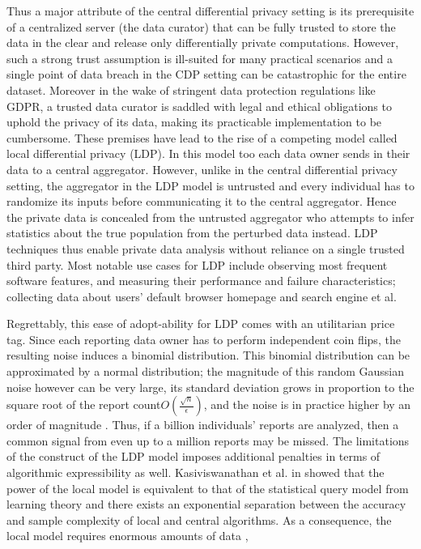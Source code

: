 \par Thus a major attribute of the central differential privacy setting is its prerequisite of a centralized server (the data curator) that can be fully trusted to store the data in the clear and release only differentially private computations. However, such a strong trust assumption is ill-suited for many practical scenarios and a single point of data breach in the CDP setting can be catastrophic for the entire dataset. Moreover in the wake of stringent data protection regulations like GDPR, a trusted data curator is saddled with legal and ethical obligations to uphold the privacy of its data, making its practicable implementation to be cumbersome. These premises have lead to the rise of a competing model called  local differential privacy (LDP). In this model too each data owner sends in their data to a central aggregator. However, unlike in the central differential privacy setting, the aggregator in the LDP model is untrusted and every individual has to randomize its inputs before communicating it to the central aggregator. Hence the private data is concealed from the untrusted aggregator who attempts to infer statistics about the true population from the perturbed data instead. LDP techniques thus enable private data analysis without reliance on a single trusted third party. Most notable use cases for LDP include observing most frequent software features, and measuring
their performance and failure characteristics; collecting data about users' default browser homepage and search engine et al. \par Regrettably, this ease of adopt-ability for LDP comes with an utilitarian price tag. Since each reporting data owner has to 
perform independent coin flips, the resulting noise induces a binomial distribution. This binomial distribution can be approximated by a normal distribution; the magnitude of this random Gaussian
noise however can be very large, its
standard deviation grows in proportion to the square root of
the report count$ O(\frac{\sqrt{n}}{\epsilon})$, and the noise is in practice higher by an
order of magnitude \cite{Prochlo,Rappor1,Rappor2,LDP1}. Thus, if a billion individuals’
reports are analyzed, then a common signal from even
up to a million reports may be missed. The limitations of the construct of the LDP model imposes additional penalties in terms of algorithmic expressibility as well.  Kasiviswanathan et al. in \cite{Kasivi} showed that the power of the local model is equivalent to that of the statistical query model \cite{SQ1} from learning theory and there exists an exponential separation between the accuracy and sample complexity of local and central algorithms.  As a consequence, the local model requires enormous amounts of data \cite{Kasivi}, 
